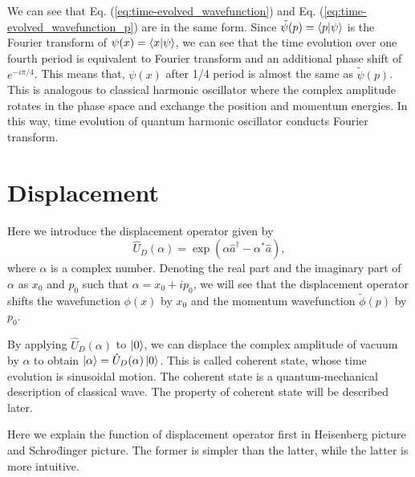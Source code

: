 \documentclass{book}
\begin{document}
We can see that Eq. (\ref{eq:time-evolved_wavefunction}) and Eq. (\ref{eq:time-evolved_wavefunction_p}) are in the same form. Since $\tilde \psi(p) = \braket{p|\psi}$ is the Fourier transform of $\psi(x)=\braket{x|\psi}$, we can see that the time evolution over one fourth period is equivalent to Fourier transform and an additional phase shift of $e^{-i\pi/4}$. This means that, $\psi(x)$ after 1/4 period is almost the same as $\tilde \psi(p)$. This is analogous to classical harmonic oscillator where the complex amplitude rotates in the phase space and exchange the position and momentum energies. In this way, time evolution of quantum harmonic oscillator conducts Fourier transform.

\begin{comment}
\begin{equation}
  \begin{aligned}
	\braket{p|n} = \int\braket{p|x}\braket{x|n}	dx
  \end{aligned}
\end{equation}
\end{comment}

\section{Displacement}
Here we introduce the displacement operator given by
\begin{equation}
  \hat U_D(\alpha) = \exp(\alpha \hat a^\dagger - \alpha^* \hat a),
\end{equation}
where $\alpha$ is a complex number. Denoting the real part and the imaginary part of $\alpha$ as $x_0$ and $p_0$ such that $\alpha = x_0 + ip_0$, we will see that the displacement operator shifts the wavefunction $\phi(x)$ by $x_0$ and the momentum wavefunction $\tilde \phi(p)$ by $p_0$. 

By applying $\hat U_D(\alpha)$ to $\ket 0$, we can displace the complex amplitude of vacuum by $\alpha$ to obtain $\ket \alpha = \hat U_D(\alpha)\ket 0$. This is called coherent state, whose time evolution is sinusoidal motion. The coherent state is a quantum-mechanical description of classical wave. The property of coherent state will be described later.

Here we explain the function of displacement operator first in Heisenberg picture and Schro\"dinger picture. The former is simpler than the latter, while the latter is more intuitive.
\end{document}
